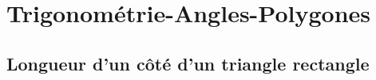 \documentclass[a4paper,11pt]{book}
\begin{document}
\chapter{Trigonom\'etrie-Angles-Polygones}
\section{Longueur d'un c\^ot\'e d'un triangle rectangle}
\end{document}
